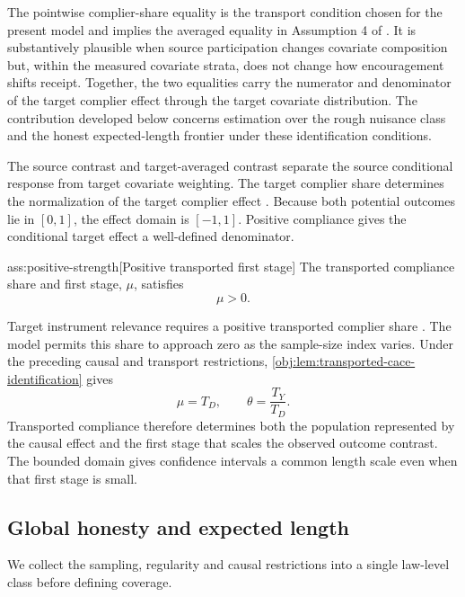 The pointwise complier-share equality is the transport condition chosen for the present model and implies the averaged equality in Assumption 4 of \citet{ChenHuang2025Generalizing}. It is substantively plausible when source participation changes covariate composition but, within the measured covariate strata, does not change how encouragement shifts receipt. Together, the two equalities carry the numerator and denominator of the target complier effect through the target covariate distribution. The contribution developed below concerns estimation over the rough nuisance class and the honest expected-length frontier under these identification conditions.



The source contrast  and target-averaged contrast  separate the source conditional response from target covariate weighting. The target complier share  determines the normalization of the target complier effect . Because both potential outcomes lie in \([0,1]\), the effect domain  is \([-1,1]\). Positive compliance gives the conditional target effect a well-defined denominator.

\begin{assumptionv}{ass:positive-strength}[Positive transported first stage]
The transported compliance share and first stage, \(\mu\), satisfies
\[
\mu>0.
\]
\end{assumptionv}

Target instrument relevance requires a positive transported complier share \citep{ChenHuang2025Generalizing}. The model permits this share to approach zero as the sample-size index varies. Under the preceding causal and transport restrictions, \cref{obj:lem:transported-cace-identification} gives
\[
\mu=T_D,
\qquad
\theta=\frac{T_Y}{T_D}.
\]
Transported compliance therefore determines both the population represented by the causal effect and the first stage that scales the observed outcome contrast. The bounded domain gives confidence intervals a common length scale even when that first stage is small.

\subsection{Global honesty and expected length}

We collect the sampling, regularity and causal restrictions into a single law-level class before defining coverage.

